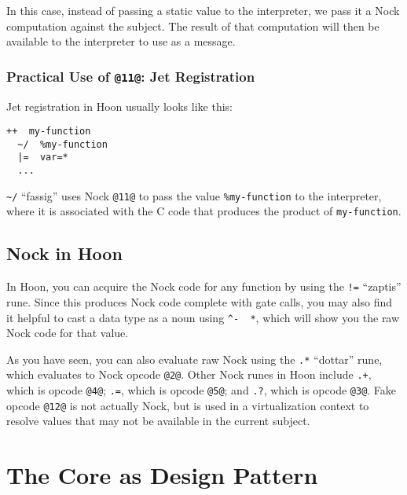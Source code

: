 \documentclass[twoside]{article}
\begin{document}
In this case, instead of passing a static value to the interpreter, we pass it a Nock computation against the subject. The result of that computation will then be available to the interpreter to use as a message.

\subsubsection{Practical Use of \lstinline[style=inlinecode]{@11@}: Jet Registration}

Jet registration in Hoon usually looks like this:

\begin{lstlisting}[style=listingcode]
++  my-function
  ~/  %my-function
  |=  var=*
  ...
\end{lstlisting}

\noindent
\lstinline[style=inlinecode]{~/} ``fassig'' uses Nock \lstinline[style=inlinecode]{@11@} to pass the value \lstinline[style=inlinecode]{%my-function} to the interpreter, where it is associated with the C code that produces the product of \lstinline[style=inlinecode]{my-function}.

\subsection{Nock in Hoon}

In Hoon, you can acquire the Nock code for any function by using the \lstinline[style=inlinecode]{!=} ``zaptis'' rune.  Since this produces Nock code complete with gate calls, you may also find it helpful to cast a data type as a noun using \lstinline[style=inlinecode]{^-  *}, which will show you the raw Nock code for that value.

As you have seen, you can also evaluate raw Nock using the \lstinline[style=inlinecode]{.*} ``dottar'' rune, which evaluates to Nock opcode \lstinline[style=inlinecode]{@2@}.  Other Nock runes in Hoon include \lstinline[style=inlinecode]{.+}, which is opcode \lstinline[style=inlinecode]{@4@}; \lstinline[style=inlinecode]{.=}, which is opcode \lstinline[style=inlinecode]{@5@}; and \lstinline[style=inlinecode]{.?}, which is opcode \lstinline[style=inlinecode]{@3@}.  Fake opcode \lstinline[style=inlinecode]{@12@} is not actually Nock, but is used in a virtualization context to resolve values that may not be available in the current subject.

\section{The Core as Design Pattern}
\end{document}
